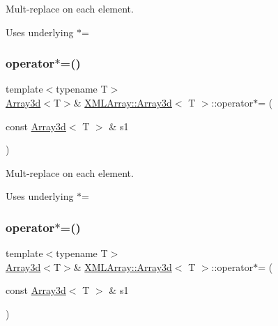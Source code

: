 Mult-\/replace on each element. 

Uses underlying $\ast$= \mbox{\label{classXMLArray_1_1Array3d_a8084893bc2fd7c37f656d6eec21189eb}} 
\subsubsection{\texorpdfstring{operator$\ast$=()}{operator*=()}\hspace{0.1cm}{\footnotesize\ttfamily [2/6]}}
{\footnotesize\ttfamily template$<$typename T$>$ \\
\mbox{\hyperlink{classXMLArray_1_1Array3d}{Array3d}}$<$T$>$\& \mbox{\hyperlink{classXMLArray_1_1Array3d}{X\+M\+L\+Array\+::\+Array3d}}$<$ T $>$\+::operator$\ast$= (\begin{DoxyParamCaption}\item[{const \mbox{\hyperlink{classXMLArray_1_1Array3d}{Array3d}}$<$ T $>$ \&}]{s1 }\end{DoxyParamCaption})\hspace{0.3cm}{\ttfamily [inline]}}



Mult-\/replace on each element. 

Uses underlying $\ast$= \mbox{\label{classXMLArray_1_1Array3d_a8084893bc2fd7c37f656d6eec21189eb}} 
\subsubsection{\texorpdfstring{operator$\ast$=()}{operator*=()}\hspace{0.1cm}{\footnotesize\ttfamily [3/6]}}
{\footnotesize\ttfamily template$<$typename T$>$ \\
\mbox{\hyperlink{classXMLArray_1_1Array3d}{Array3d}}$<$T$>$\& \mbox{\hyperlink{classXMLArray_1_1Array3d}{X\+M\+L\+Array\+::\+Array3d}}$<$ T $>$\+::operator$\ast$= (\begin{DoxyParamCaption}\item[{const \mbox{\hyperlink{classXMLArray_1_1Array3d}{Array3d}}$<$ T $>$ \&}]{s1 }\end{DoxyParamCaption})\hspace{0.3cm}{\ttfamily [inline]}}



